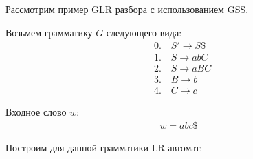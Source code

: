 \begin{example}
    \label{glr:example}
    Рассмотрим пример GLR разбора с использованием GSS.
    
    Возьмем грамматику $G$ следующего вида:
    \begin{align*}
        &0.\quad S' \to S\$ \\
        &1.\quad S \to abC \\
        &2.\quad S \to aBC \\
        &3.\quad B \to b \\
        &4.\quad C \to c 
    \end{align*}
    
    Входное слово $ w $:
    \begin{align*}
        w = abc\$
    \end{align*}
    
    Построим для данной грамматики LR автомат:
    
    \begin{tikzpicture}[x=0.75pt,y=0.75pt,yscale=-1,xscale=1]
    

\end{tikzpicture}
\end{example}
